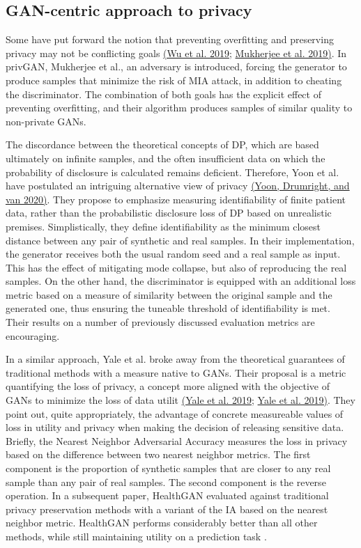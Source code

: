\documentclass[10pt]{article}
\begin{document}
\subsection{GAN-centric approach to privacy}
Some have put forward the notion that preventing overfitting and preserving privacy may not be conflicting goals \hyperref[csl:58]{(Wu et al. 2019}; \hyperref[csl:59]{Mukherjee et al. 2019)}. In privGAN, Mukherjee et al., an adversary is introduced, forcing the generator to produce samples that minimize the risk of MIA attack, in addition to cheating the discriminator. The combination of both goals has the explicit effect of preventing overfitting, and their algorithm produces samples of similar quality to non-private GANs.\par
The discordance between the theoretical concepts of DP, which are  based ultimately on infinite samples, and the often insufficient data on which the probability of disclosure is calculated remains deficient. Therefore, Yoon et al. have postulated an intriguing alternative view of privacy \hyperref[csl:34]{(Yoon, Drumright, and van 2020)}. They propose to emphasize measuring identifiability of finite patient data, rather than the probabilistic disclosure loss of DP based on unrealistic premises. Simplistically, they define identifiability as the minimum closest distance between any pair of synthetic and real samples. In their implementation, the generator receives both the usual random seed and a real sample as input. This has the effect of mitigating mode collapse, but also of reproducing the real samples. On the other hand, the discriminator is equipped with an additional loss metric based on a measure of similarity between the original sample and the generated one, thus ensuring the tuneable threshold of identifiability is met. Their results on a number of previously discussed evaluation metrics are encouraging.\par
In a similar approach, Yale et al. broke away from the theoretical guarantees of traditional methods with a measure native to GANs. Their proposal is a metric quantifying the loss of privacy, a concept more aligned with the objective of GANs to minimize the loss of data utilit \hyperref[csl:35]{(Yale et al. 2019}; \hyperref[csl:36]{Yale et al. 2019)}. They point out, quite appropriately, the advantage of concrete measureable values of loss in utility and privacy when making the decision of releasing sensitive data. Briefly, the Nearest Neighbor Adversarial Accuracy measures the loss in privacy based on the difference between two nearest neighbor metrics. The  first component is the proportion of synthetic samples that are closer to any real sample than any pair of real samples. The second component is the reverse operation. In a subsequent paper, HealthGAN evaluated against traditional privacy preservation methods with a variant of the IA based on the nearest neighbor metric. HealthGAN performs considerably better than all other methods, while still maintaining utility on a prediction task .
\end{document}
